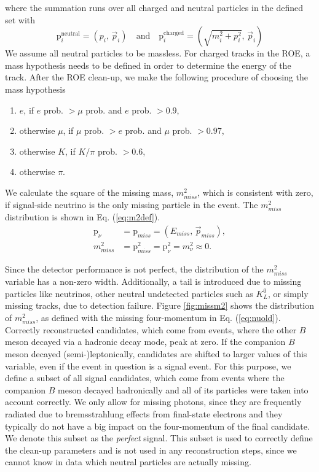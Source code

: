 where the summation runs over all charged and neutral particles in the defined set with
\begin{equation}
\mathrm{p}^{\mathrm{neutral}}_i = \left(p_i,\, \vec{p}_i \right) \quad \mathrm{and} \quad \mathrm{p}^{\mathrm{charged}}_i = \left(\sqrt{m_i^2 + p_i^2},\, \vec{p}_i \right)
\label{eq:pcharged}
\end{equation}
We assume all neutral particles to be massless. For charged tracks in the ROE, a mass hypothesis needs to be defined in order to determine the energy of the track. After the ROE clean-up, we make the following procedure of choosing the mass hypothesis
\begin{enumerate}
	\item $e$, if $e$ prob. $> \mu$ prob. and $e$ prob. $> 0.9$,
	\item otherwise $\mu$, if $\mu$ prob. $> e$ prob. and $\mu$ prob. $> 0.97$,
	\item otherwise $K$, if $K/\pi$ prob. $> 0.6$,
	\item otherwise $\pi$.
\end{enumerate} 
We calculate the square of the missing mass, $m_{miss}^2$, which is consistent with zero, if signal-side neutrino is the only missing particle in the event. The $m_{miss}^2$ distribution is shown in Eq. (\ref{eq:m2def}).
\begin{align}
\label{eq:nuold}
\mathrm{p}_\nu &= \mathrm{p}_{miss} = \left(E_{miss},\,\vec{p}_{miss} \right),\\
\label{eq:m2def}
m_{miss}^2 &= \mathrm{p}_{miss}^2 = \mathrm{p}_{\nu}^2 = m_\nu^2 \approx 0.
\end{align}

Since the detector performance is not perfect, the distribution of the $m_{miss}^2$ variable has a non-zero width. Additionally, a tail is introduced due to missing particles like neutrinos, other neutral undetected particles such as $K_L^0$, or simply missing tracks, due to detection failure. Figure \ref{fig:missm2} shows the distribution of $m_{miss}^2$, as defined with the missing four-momentum in Eq. (\ref{eq:nuold}). Correctly reconstructed candidates, which come from events, where the other $B$ meson decayed via a hadronic decay mode, peak at zero. If the companion $B$ meson decayed (semi-)leptonically, candidates are shifted to larger values of this variable, even if the event in question is a signal event. For this purpose, we define a subset of all signal candidates, which come from events where the companion $B$ meson decayed hadronically and all of its particles were taken into account correctly. We only allow for missing photons, since they are frequently radiated due to bremsstrahlung effects from final-state electrons and they typically do not have a big impact on the four-momentum of the final candidate. We denote this subset as the \textit{perfect} signal. This subset is used to correctly define the clean-up parameters and is not used in any reconstruction steps, since we cannot know in data which neutral particles are actually missing.

